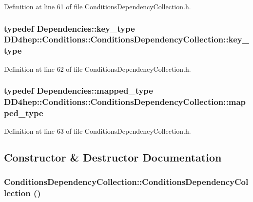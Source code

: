 Definition at line 61 of file ConditionsDependencyCollection.h.\hypertarget{class_d_d4hep_1_1_conditions_1_1_conditions_dependency_collection_a97fa0f42a622cd23c6eeb92e2b63efab}{
\subsubsection[{key\_\-type}]{\setlength{\rightskip}{0pt plus 5cm}typedef Dependencies::key\_\-type {\bf DD4hep::Conditions::ConditionsDependencyCollection::key\_\-type}}}
\label{class_d_d4hep_1_1_conditions_1_1_conditions_dependency_collection_a97fa0f42a622cd23c6eeb92e2b63efab}


Definition at line 62 of file ConditionsDependencyCollection.h.\hypertarget{class_d_d4hep_1_1_conditions_1_1_conditions_dependency_collection_a406b7e79f4192c1d4ab1cdeb500d81f4}{
\subsubsection[{mapped\_\-type}]{\setlength{\rightskip}{0pt plus 5cm}typedef Dependencies::mapped\_\-type {\bf DD4hep::Conditions::ConditionsDependencyCollection::mapped\_\-type}}}
\label{class_d_d4hep_1_1_conditions_1_1_conditions_dependency_collection_a406b7e79f4192c1d4ab1cdeb500d81f4}


Definition at line 63 of file ConditionsDependencyCollection.h.

\subsection{Constructor \& Destructor Documentation}
\hypertarget{class_d_d4hep_1_1_conditions_1_1_conditions_dependency_collection_af714a3d709ece6040aea1e4d65645015}{
\subsubsection[{ConditionsDependencyCollection}]{\setlength{\rightskip}{0pt plus 5cm}ConditionsDependencyCollection::ConditionsDependencyCollection ()}}
\label{class_d_d4hep_1_1_conditions_1_1_conditions_dependency_collection_af714a3d709ece6040aea1e4d65645015}


